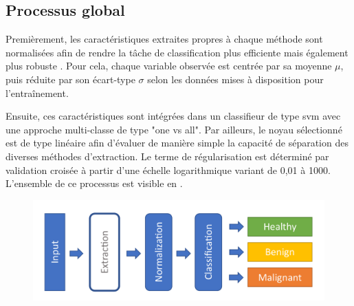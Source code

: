 \documentclass{gretsi}
\begin{document}
\begin{sloppypar}
\subsection{Processus global}
Premièrement, les caractéristiques extraites propres à chaque méthode sont normalisées afin de rendre la tâche de classification plus efficiente mais également plus robuste \cite{graf2001}. Pour cela, chaque variable observée est centrée par sa moyenne $\mu$, puis réduite par son écart-type $\sigma$ selon les données mises à disposition pour l'entraînement.\par
Ensuite, ces caractéristiques sont intégrées dans un classifieur de type \ac{svm} avec une approche multi-classe de type "one vs all". Par ailleurs, le noyau sélectionné est de type linéaire afin d'évaluer de manière simple la capacité de séparation des diverses méthodes d'extraction. Le terme de régularisation est déterminé par validation croisée à partir d'une échelle logarithmique variant de 0,01 à 1000. L'ensemble de ce processus est visible en .\par
\par
\begin{figure}[h]
    \begin{center} 
        \includegraphics[width=0.8\linewidth]{content/figures/Simple.pdf}
        \label{pipeline}
    \end{center} 
\end{figure}

\end{sloppypar}
\end{document}
